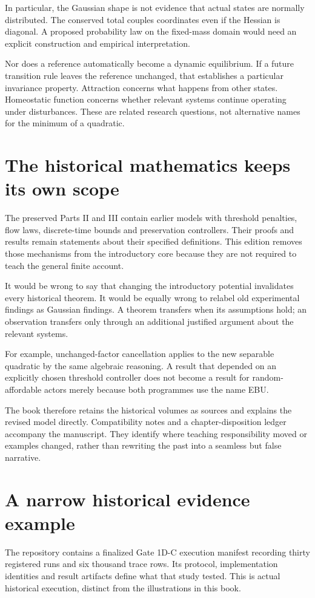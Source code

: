 In particular, the Gaussian shape is not evidence that actual states are normally distributed. The conserved total couples coordinates even if the Hessian is diagonal. A proposed probability law on the fixed-mass domain would need an explicit construction and empirical interpretation.

Nor does a reference automatically become a dynamic equilibrium. If a future transition rule leaves the reference unchanged, that establishes a particular invariance property. Attraction concerns what happens from other states. Homeostatic function concerns whether relevant systems continue operating under disturbances. These are related research questions, not alternative names for the minimum of a quadratic.

\section{The historical mathematics keeps its own scope}
The preserved Parts II and III contain earlier models with threshold penalties, flow laws, discrete-time bounds and preservation controllers. Their proofs and results remain statements about their specified definitions. This edition removes those mechanisms from the introductory core because they are not required to teach the general finite account.

It would be wrong to say that changing the introductory potential invalidates every historical theorem. It would be equally wrong to relabel old experimental findings as Gaussian findings. A theorem transfers when its assumptions hold; an observation transfers only through an additional justified argument about the relevant systems.

For example, unchanged-factor cancellation applies to the new separable quadratic by the same algebraic reasoning. A result that depended on an explicitly chosen threshold controller does not become a result for random-affordable actors merely because both programmes use the name EBU.

The book therefore retains the historical volumes as sources and explains the revised model directly. Compatibility notes and a chapter-disposition ledger accompany the manuscript. They identify where teaching responsibility moved or examples changed, rather than rewriting the past into a seamless but false narrative.

\section{A narrow historical evidence example}
The repository contains a finalized Gate 1D-C execution manifest recording thirty registered runs and six thousand trace rows. Its protocol, implementation identities and result artifacts define what that study tested. This is actual historical execution, distinct from the illustrations in this book.\cite{gate1dc}

